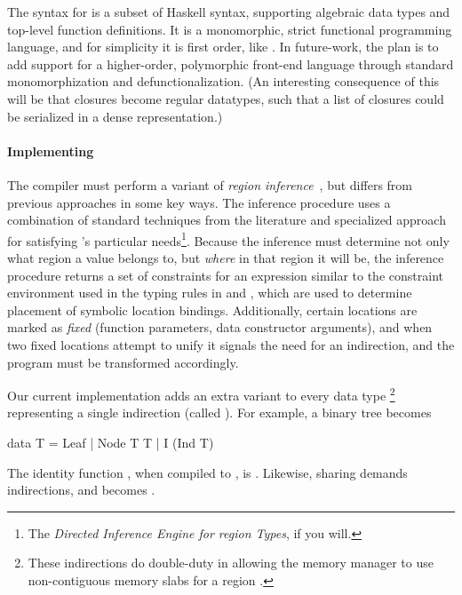 {The syntax for \lamadt is a subset of Haskell syntax, supporting
  algebraic data types and top-level function definitions. It is a
  monomorphic, strict functional programming language, and for
  simplicity it is first order, like \ourcalc.}
{In future-work, the plan is to add support for a higher-order, polymorphic
  front-end language through standard monomorphization and defunctionalization.
  (An interesting consequence of this will be that closures become regular
  datatypes, such that a list of closures could be serialized in a dense
  representation.)}


\paragraph{Implementing \lamadt}
The compiler must perform a variant of {\em region
  inference}~\cite{regioncalcs,mlkit-retrospective}, but differs from
previous approaches in some key ways.
%
The inference procedure uses a combination of standard techniques from the literature and specialized
approach for satisfying \ourcalc's particular needs\footnote{The {\em
    Directed Inference Engine for region Types}, if you will.}.
%
Because the inference must determine not only what region a value belongs to,
but \emph{where} in that region it will be, the inference procedure returns a
set of constraints for an expression similar to the constraint environment used
in the typing rules in  and , which are
used to determine placement of symbolic location bindings. Additionally, certain
locations are marked as \emph{fixed} (function parameters, data constructor
arguments), and when two fixed locations attempt to unify it signals the need
for an indirection, and the program must be transformed accordingly.

Our current implementation adds an extra variant to every data type
\footnote{These indirections do double-duty in allowing the memory
  manager to use non-contiguous memory slabs for a region .}
representing a single indirection (called ).  For example, a binary tree
 becomes
\begin{code}
data T = Leaf | Node T T | I (Ind T)
\end{code}
%
The identity function , when compiled to \ourcalc, is .
Likewise, sharing demands indirections, and
becomes
.
%
%


